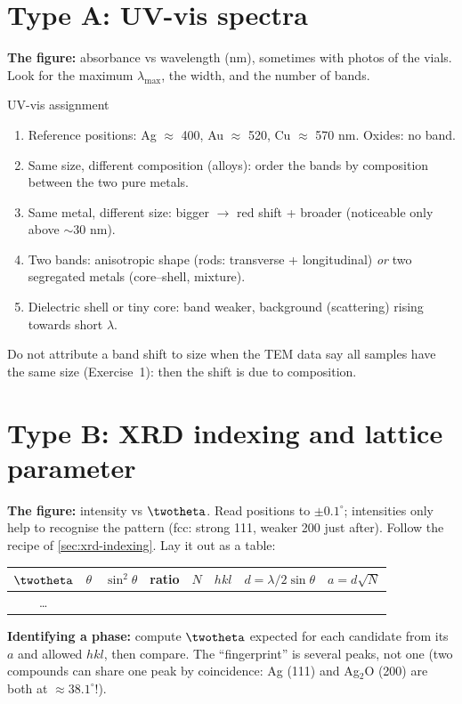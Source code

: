 \section{Type A: UV-vis spectra}
\textbf{The figure:} absorbance vs wavelength (nm), sometimes with photos of the vials. Look for the maximum
$\lambda_\mathrm{max}$, the width, and the number of bands.
\begin{recipe}{UV-vis assignment}
\begin{enumerate}
  \item Reference positions: Ag $\approx$ 400, Au $\approx$ 520, Cu $\approx$ 570 nm. Oxides: no band.
  \item Same size, different composition (alloys): order the bands by composition between the two pure metals.
  \item Same metal, different size: bigger $\to$ red shift + broader (noticeable only above $\sim$30 nm).
  \item Two bands: anisotropic shape (rods: transverse + longitudinal) \emph{or} two segregated metals (core--shell, mixture).
  \item Dielectric shell or tiny core: band weaker, background (scattering) rising towards short $\lambda$.
\end{enumerate}
\end{recipe}
\begin{pitfall}
Do not attribute a band shift to size when the TEM data say all samples have the same size (Exercise~1): then the shift is
due to composition.
\end{pitfall}

\section{Type B: XRD indexing and lattice parameter}
\textbf{The figure:} intensity vs $\twotheta$. Read positions to $\pm0.1^\circ$; intensities only help to recognise the
pattern (fcc: strong 111, weaker 200 just after).
Follow the recipe of \cref{sec:xrd-indexing}. Lay it out as a table:
\begin{center}
\begin{tabular}{@{}cccccccc@{}}
\toprule
$\twotheta$ & $\theta$ & $\sin^2\theta$ & ratio & $N$ & $hkl$ & $d = \lambda/2\sin\theta$ & $a = d\sqrt N$ \\ \midrule
\ldots & & & & & & & \\ \bottomrule
\end{tabular}
\end{center}
\textbf{Identifying a phase:} compute $\twotheta$ expected for each candidate from its $a$ and allowed $hkl$, then compare.
The ``fingerprint'' is several peaks, not one (two compounds can share one peak by coincidence: Ag (111) and
Ag$_2$O (200) are both at $\approx38.1^\circ$!).

